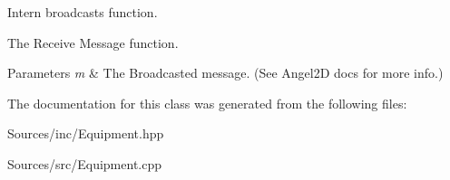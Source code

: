 Intern broadcasts function. 

The Receive Message function. 
\begin{DoxyParams}{Parameters}
{\em m} & The Broadcasted message. (See Angel2\+D docs for more info.) \\
\hline
\end{DoxyParams}


The documentation for this class was generated from the following files\+:\begin{DoxyCompactItemize}
\item 
Sources/inc/Equipment.\+hpp\item 
Sources/src/Equipment.\+cpp\end{DoxyCompactItemize}
